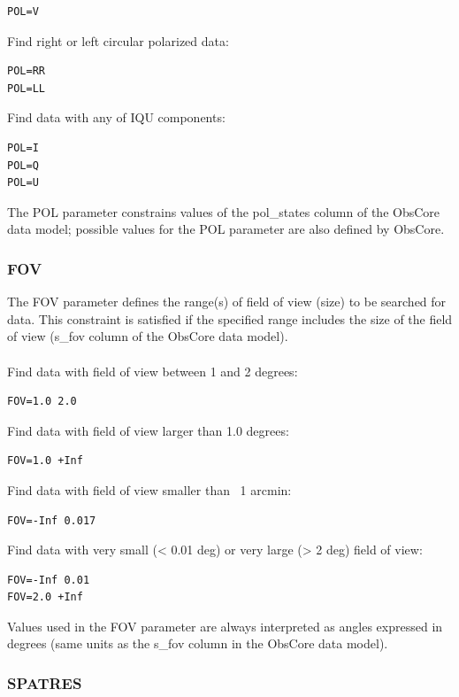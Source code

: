 \documentclass[11pt,a4paper]{ivoa}
\begin{document}
\begin{lstlisting}
POL=V
\end{lstlisting}
Find  right or left circular polarized data:

\begin{lstlisting}
POL=RR
POL=LL
\end{lstlisting}
Find data with any of IQU components:

\begin{lstlisting}
POL=I
POL=Q
POL=U
\end{lstlisting}

The POL parameter constrains values of the pol\_states column of the ObsCore data model; possible values for the POL parameter are also defined by ObsCore.


\subsubsection{FOV}

The FOV parameter defines the range(s) of field of view (size) to be searched for data. This constraint is satisfied if the specified range includes the size of the field of view (s\_fov column of the ObsCore data model). \\ \\
Find data with field of view between 1 and 2 degrees:

\begin{lstlisting}
FOV=1.0 2.0
\end{lstlisting}
Find data with field of view larger than 1.0 degrees:

\begin{lstlisting}
FOV=1.0 +Inf
\end{lstlisting}
Find data with field of view smaller than ~1 arcmin:

\begin{lstlisting}
FOV=-Inf 0.017
\end{lstlisting}
Find data with very small (< 0.01 deg) or very large (> 2 deg) field of view:

\begin{lstlisting}
FOV=-Inf 0.01
FOV=2.0 +Inf
\end{lstlisting}

Values used in the FOV parameter are always interpreted as angles expressed in degrees (same units as the s\_fov column in the ObsCore data model).

\subsubsection{SPATRES}
\end{document}
